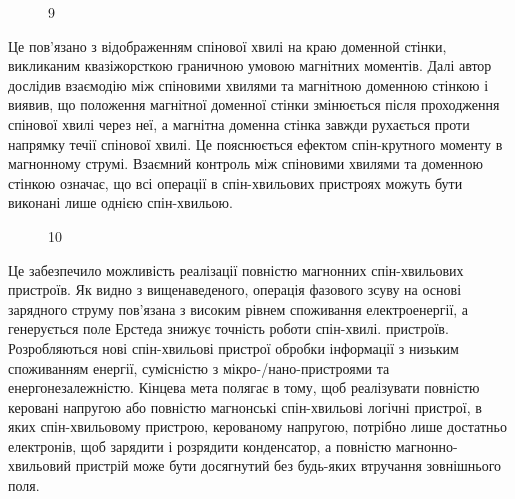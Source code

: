 \documentclass[a4paper,14pt]{extreport}
\begin{document}
\begin{figure}[h!]
   \caption{9}
 \end{figure}


   Це пов'язано з відображенням спінової хвилі на краю доменной стінки, викликаним квазіжорсткою граничною умовою магнітних моментів. Далі автор дослідив взаємодію між спіновими хвилями та магнітною доменною стінкою і виявив, що положення магнітної доменної стінки змінюється після проходження спінової хвилі через неї, а магнітна доменна стінка завжди рухається проти напрямку течії спінової хвилі. Це пояснюється ефектом спін-крутного моменту в магнонному струмі. Взаємний контроль між спіновими хвилями та доменною стінкою означає, що всі операції в спін-хвильових пристроях можуть бути виконані лише однією спін-хвильою.\\ 

\begin{figure}[h!]
   \caption{10}
 \end{figure}

    Це забезпечило можливість реалізації повністю магнонних спін-хвильових пристроїв. Як видно з вищенаведеного, операція фазового зсуву на основі зарядного струму пов'язана з високим рівнем споживання електроенергії, а генерується поле Ерстеда знижує точність роботи спін-хвилі. пристроїв. Розробляються нові спін-хвильові пристрої обробки інформації з низьким споживанням енергії, сумісністю з мікро-/нано-пристроями та енергонезалежністю. Кінцева мета полягає в тому, щоб реалізувати повністю керовані напругою або повністю магнонські спін-хвильові логічні пристрої, в яких спін-хвильовому пристрою, керованому напругою, потрібно лише достатньо електронів, щоб зарядити і розрядити конденсатор, а повністю магнонно-хвильовий пристрій може бути досягнутий без будь-яких втручання зовнішнього поля.
\end{document}
